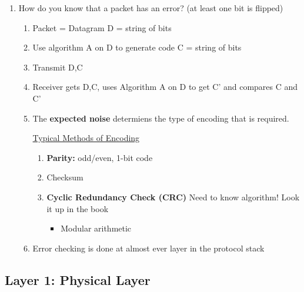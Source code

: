 \documentclass[11pt]{article}
\begin{document}
\begin{enumerate}
\item How do you know that a packet has an error?
\label{sec:orgheadline24}
(at least one bit is flipped)
\begin{enumerate}
\item Packet = Datagram D = string of bits
\item Use algorithm A on D to generate code C = string of bits
\item Transmit D,C
\item Receiver gets D,C, uses Algorithm A on D to get C' and compares C and C'

\item The \textbf{expected noise} determiens the type of encoding that is required. 

\uline{Typical Methods of Encoding}
\begin{enumerate}
\item \textbf{Parity:} odd/even, 1-bit code
\item Checksum
\item \textbf{Cyclic Redundancy Check (CRC)} Need to know algorithm! Look it up
in the book
\begin{itemize}
\item Modular arithmetic
\end{itemize}
\end{enumerate}

\item Error checking is done at almost ever layer in the protocol stack
\end{enumerate}
\end{enumerate}

\subsection{Layer 1: Physical Layer}
\label{sec:orgheadline27}
\end{document}
